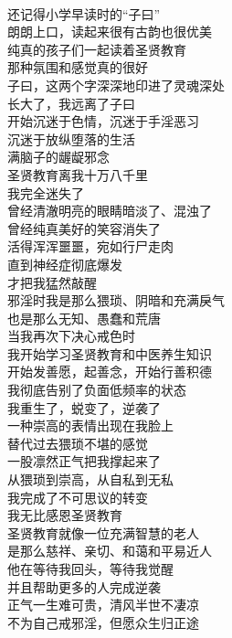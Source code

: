 \begin{poem}[从猥琐到崇高]
    \begin{multicols}{2}
        \begin{center}~\\
            还记得小学早读时的“子曰” \\ 朗朗上口，读起来很有古韵也很优美 \\ 纯真的孩子们一起读着圣贤教育 \\ 那种氛围和感觉真的很好 \\ 子曰，这两个字深深地印进了灵魂深处 \\ 长大了，我远离了子曰 \\ 开始沉迷于色情，沉迷于手淫恶习 \\ 沉迷于放纵堕落的生活 \\ 满脑子的龌龊邪念 \\ 圣贤教育离我十万八千里 \\ 我完全迷失了 \\ 曾经清澈明亮的眼睛暗淡了、混浊了 \\ 曾经纯真美好的笑容消失了 \\ 活得浑浑噩噩，宛如行尸走肉 \\ 直到神经症彻底爆发 \\ 才把我猛然敲醒 \\ 邪淫时我是那么猥琐、阴暗和充满戾气 \\ 也是那么无知、愚蠢和荒唐 \\ 当我再次下决心戒色时 \\ 我开始学习圣贤教育和中医养生知识 \\ 开始发善愿，起善念，开始行善积德 \\ 我彻底告别了负面低频率的状态 \\ 我重生了，蜕变了，逆袭了 \\ 一种崇高的表情出现在我脸上 \\ 替代过去猥琐不堪的感觉 \\ 一股凛然正气把我撑起来了 \\ 从猥琐到崇高，从自私到无私 \\ 我完成了不可思议的转变 \\ 我无比感恩圣贤教育 \\ 圣贤教育就像一位充满智慧的老人 \\ 是那么慈祥、亲切、和蔼和平易近人 \\ 他在等待我回头，等待我觉醒 \\ 并且帮助更多的人完成逆袭 \\ 正气一生难可贵，清风半世不凄凉 \\ 不为自己戒邪淫，但愿众生归正途
        \end{center}
    \end{multicols}
\end{poem}

